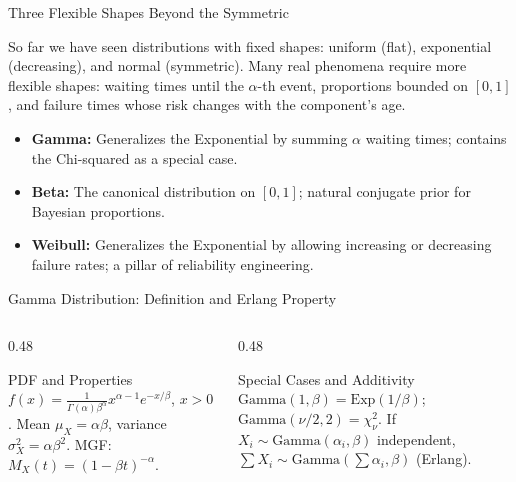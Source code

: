 \documentclass[aspectratio=169,xcolor={dvipsnames,table}]{beamer}
\begin{document}
\begin{frame}{Three Flexible Shapes Beyond the Symmetric}
	\footnotesize
	\begin{motivacion}
		So far we have seen distributions with fixed shapes: uniform (flat), exponential (decreasing), and normal (symmetric). Many real phenomena require more flexible shapes: waiting times until the $\alpha$-th event, proportions bounded on $[0,1]$, and failure times whose risk changes with the component's age.
	\end{motivacion}
	\vspace{0.15cm}
	\pause
	\begin{itemize}\itemsep=0.1cm
		\item \textbf{Gamma:} Generalizes the Exponential by summing $\alpha$ waiting times; contains the Chi-squared as a special case. \pause
		\item \textbf{Beta:} The canonical distribution on $[0,1]$; natural conjugate prior for Bayesian proportions. \pause
		\item \textbf{Weibull:} Generalizes the Exponential by allowing increasing or decreasing failure rates; a pillar of reliability engineering.
	\end{itemize}
\end{frame}

\begin{frame}{Gamma Distribution: Definition and Erlang Property}
	\vspace{-0.15cm}
	\begin{columns}[T]
		\begin{column}{0.48\textwidth}
			\begin{block}{PDF and Properties}
				\footnotesize
				$f(x) = \frac{1}{\Gamma(\alpha)\beta^{\alpha}}x^{\alpha-1}e^{-x/\beta}$, $x>0$. Mean $\mu_{X}=\alpha\beta$, variance $\sigma_{X}^{2}=\alpha\beta^{2}$. MGF: $M_{X}(t)=(1-\beta t)^{-\alpha}$.
			\end{block}
		\end{column}
		\begin{column}{0.48\textwidth}
			\begin{alertblock}{Special Cases and Additivity}
				\footnotesize
				$\text{Gamma}(1,\beta)=\text{Exp}(1/\beta)$; $\text{Gamma}(\nu/2,2)=\chi^{2}_{\nu}$. If $X_{i}\sim\text{Gamma}(\alpha_{i},\beta)$ independent, $\sum X_{i} \sim \text{Gamma}(\sum\alpha_{i},\beta)$ (Erlang).
			\end{alertblock}
		\end{column}
	\end{columns}
\end{frame}
\end{document}
